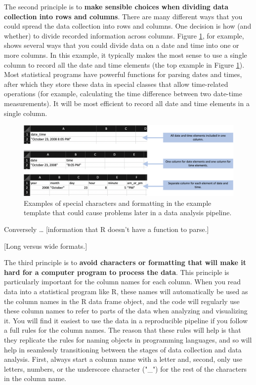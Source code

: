 \documentclass[]{tufte-book}
\begin{document}
The second principle is to \textbf{make sensible choices when dividing data collection
into rows and columns}. There are many different ways that you could spread the
data collection into rows and columns. One decision is how (and whether) to
divide recorded information across columns. Figure \ref{fig:arrangingcolumns},
for example, shows several ways that you could divide data on a date and time
into one or more columns. In this example, it typically makes the most sense
to use a single column to record all the date and time elements (the top example
in Figure \ref{fig:arrangingcolumns}). Most statistical programs have powerful
functions for parsing dates and times, after which they store these data in special
classes that allow time-related operations (for example, calculating the time difference
between two date-time measurements). It will be most efficient to record all date and
time elements in a single column.

\begin{figure}
\includegraphics[width=\textwidth]{figures/arranging_columns} \caption[Examples of special characters and formatting in the example template that could cause problems later in a data analysis pipeline]{Examples of special characters and formatting in the example template that could cause problems later in a data analysis pipeline.}\label{fig:arrangingcolumns}
\end{figure}

Conversely \ldots{} {[}information that R doesn't have a function to parse.{]}

{[}Long versus wide formats.{]}

The third principle is to \textbf{avoid characters or formatting that will make it
hard for a computer program to process the data}. This principle is
particularly important for the column names for each column. When you read data
into a statistical program like R, these names will automatically be used as the
column names in the R data frame object, and the code will regularly use these
column names to refer to parts of the data when analyzing and visualizing it.
You will find it easiest to use the data in a reproducible pipeline if you
follow a full rules for the column names. The reason that these rules will help
is that they replicate the rules for naming objects in programming languages,
and so will help in seamlessly transitioning between the stages of data
collection and data analysis. First, always start a column name with a letter
and, second, only use letters, numbers, or the underscore character ("\_") for
the rest of the characters in the column name.
\end{document}

